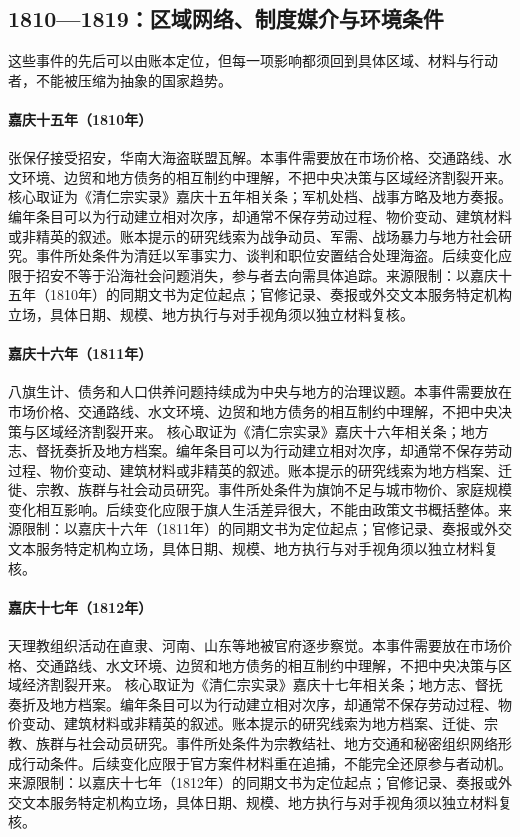 \subsection{1810—1819：区域网络、制度媒介与环境条件}
这些事件的先后可以由账本定位，但每一项影响都须回到具体区域、材料与行动者，不能被压缩为抽象的国家趋势。
\hypertarget{civic:EQ-1810-ZHANG-BAOZAI-SURRENDER}{}\paragraph{嘉庆十五年（1810年）}张保仔接受招安，华南大海盗联盟瓦解。本事件需要放在市场价格、交通路线、水文环境、边贸和地方债务的相互制约中理解，不把中央决策与区域经济割裂开来。 核心取证为《清仁宗实录》嘉庆十五年相关条；军机处档、战事方略及地方奏报。编年条目可以为行动建立相对次序，却通常不保存劳动过程、物价变动、建筑材料或非精英的叙述。账本提示的研究线索为战争动员、军需、战场暴力与地方社会研究。事件所处条件为清廷以军事实力、谈判和职位安置结合处理海盗。后续变化应限于招安不等于沿海社会问题消失，参与者去向需具体追踪。来源限制：以嘉庆十五年（1810年）的同期文书为定位起点；官修记录、奏报或外交文本服务特定机构立场，具体日期、规模、地方执行与对手视角须以独立材料复核。
\hypertarget{civic:EQ-1811-BANNER-LIVELIHOOD}{}\paragraph{嘉庆十六年（1811年）}八旗生计、债务和人口供养问题持续成为中央与地方的治理议题。本事件需要放在市场价格、交通路线、水文环境、边贸和地方债务的相互制约中理解，不把中央决策与区域经济割裂开来。 核心取证为《清仁宗实录》嘉庆十六年相关条；地方志、督抚奏折及地方档案。编年条目可以为行动建立相对次序，却通常不保存劳动过程、物价变动、建筑材料或非精英的叙述。账本提示的研究线索为地方档案、迁徙、宗教、族群与社会动员研究。事件所处条件为旗饷不足与城市物价、家庭规模变化相互影响。后续变化应限于旗人生活差异很大，不能由政策文书概括整体。来源限制：以嘉庆十六年（1811年）的同期文书为定位起点；官修记录、奏报或外交文本服务特定机构立场，具体日期、规模、地方执行与对手视角须以独立材料复核。
\hypertarget{civic:EQ-1812-TIANLI-PREPARATION}{}\paragraph{嘉庆十七年（1812年）}天理教组织活动在直隶、河南、山东等地被官府逐步察觉。本事件需要放在市场价格、交通路线、水文环境、边贸和地方债务的相互制约中理解，不把中央决策与区域经济割裂开来。 核心取证为《清仁宗实录》嘉庆十七年相关条；地方志、督抚奏折及地方档案。编年条目可以为行动建立相对次序，却通常不保存劳动过程、物价变动、建筑材料或非精英的叙述。账本提示的研究线索为地方档案、迁徙、宗教、族群与社会动员研究。事件所处条件为宗教结社、地方交通和秘密组织网络形成行动条件。后续变化应限于官方案件材料重在追捕，不能完全还原参与者动机。来源限制：以嘉庆十七年（1812年）的同期文书为定位起点；官修记录、奏报或外交文本服务特定机构立场，具体日期、规模、地方执行与对手视角须以独立材料复核。
